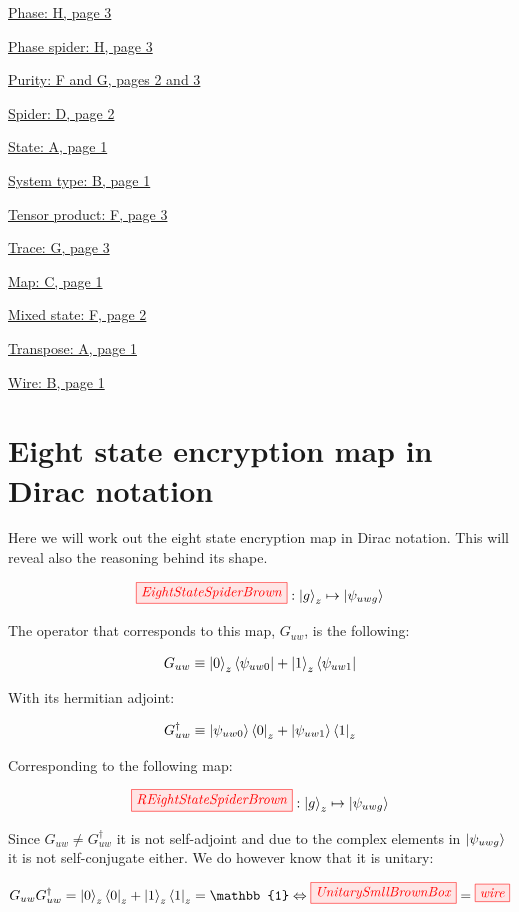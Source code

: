 \documentclass[]{article}
\begin{document}
\hyperref[phasespiders]{Phase: H, page 3}

\hyperref[phasespiders]{Phase spider: H, page 3}

\hyperref[doubling]{Purity: F and G, pages 2 and 3}

\hyperref[spiders]{Spider: D, page 2}

\hyperref[braandket]{State: A, page 1}

\hyperref[identity]{System type: B, page 1}

\hyperref[doubling]{Tensor product: F, page 3}

\hyperref[discarding]{Trace: G, page 3}

\hyperref[maps]{Map: C, page 1}

\hyperref[doubling]{Mixed state: F, page 2}

\hyperref[braandket]{Transpose: A, page 1}

\hyperref[identity]{Wire: B, page 1}

\section{Eight state encryption map in Dirac notation}
\label{appendix:EightStateEncryptionMapDirac}
Here we will work out the eight state encryption map in Dirac notation. This will reveal also the reasoning behind its shape. 

\begin{equation}
\tikzfig{EightStateSpiderBrown} :
\ket{g}_z \mapsto \ket{\psi_{uwg}}
\end{equation}

The operator that corresponds to this map, $G_{uw}$, is the following:

\begin{equation}
	G_{uw} \equiv \ket{0}_z\bra{\psi_{uw0}} + \ket{1}_z\bra{\psi_{uw1}}
\end{equation}

With its hermitian adjoint:

\begin{equation}
G_{uw}^\dagger \equiv \ket{\psi_{uw0}}\bra{0}_z + \ket{\psi_{uw1}}\bra{1}_z
\end{equation}

Corresponding to the following map:

\begin{equation}
\tikzfig{REightStateSpiderBrown} :
\ket{g}_z \mapsto \ket{\psi_{uwg}}
\end{equation}

Since $G_{uw} \neq G_{uw}^\dagger$ it is not self-adjoint and due to the complex elements in $\ket{\psi_{uwg}}$ it is not self-conjugate either. We do however know that it is unitary:

\begin{equation}
	G_{uw}G_{uw}^\dagger = \ket{0}_z\bra{0}_z + \ket{1}_z\bra{1}_z = \mathbb{1} \Leftrightarrow \tikzfig{UnitarySmllBrownBox} = \tikzfig{wire}
\end{equation}
\end{document}
